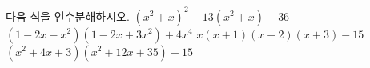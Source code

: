 다음 식을 인수분해하시오.
 $(x^2+x)^2-13(x^2+x)+36$
 $(1-2x-x^2)(1-2x+3x^2)+4x^4$
 $x(x+1)(x+2)(x+3)-15$
 $(x^2+4x+3)(x^2+12x+35)+15$
